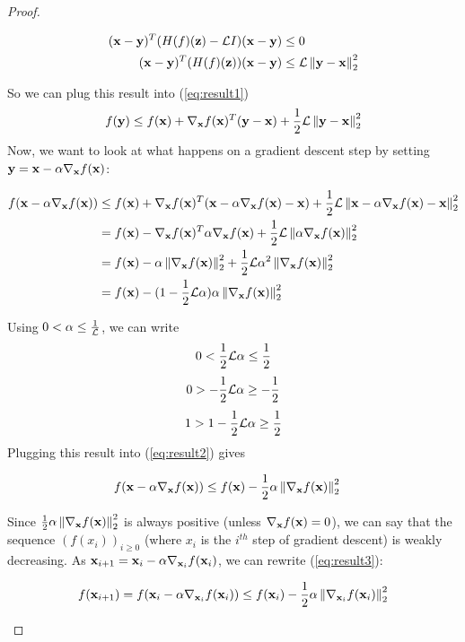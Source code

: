 \begin{proof}
\begin{ceqn}
\begin{align*}
            (\vx-\vy)^T(H(f)(\vz) - \Lip I)(\vx - \vy) &\leq 0 \\
            (\vx-\vy)^T(H(f)(\vz))(\vx - \vy) &\leq \Lip \norm{\vy-\vx}_2^2 
        \end{align*}
    \end{ceqn}
    So we can plug this result into (\ref{eq:result1})
    $$f(\vy) \leq f(\vx) + \nabla_\vx f(\vx)^T(\vy-\vx) + \frac{1}{2} \Lip \norm{\vy-\vx}_2^2$$
    Now, we want to look at what happens on a gradient descent step by setting $\vy = \vx - \alpha \nabla_\vx f(\vx)$:  
    \begin{ceqn}
        \begin{align}
            f(\vx - \alpha \nabla_\vx f(\vx)) &\leq f(\vx) + \nabla_\vx f(\vx)^T(\vx - \alpha \nabla_\vx f(\vx)-\vx) + \frac{1}{2} \Lip \norm{\vx - \alpha \nabla_\vx f(\vx)-\vx}_2^2 \notag \\
            &= f(\vx) - \nabla_\vx f(\vx)^T \alpha \nabla_\vx f(\vx) + \frac{1}{2} \Lip \norm{\alpha \nabla_\vx f(\vx)}_2^2 \notag \\
            &= f(\vx) - \alpha \norm{\nabla_\vx f(\vx)}_2^2 + \frac{1}{2} \Lip \alpha^2 \norm{\nabla_\vx f(\vx)}_2^2\notag \\
            &= f(\vx) - (1 - \frac{1}{2} \Lip \alpha) \alpha \norm{\nabla_\vx f(\vx)}_2^2 \label{eq:result2}
        \end{align}
    \end{ceqn}
    Using $0 < \alpha \leq \frac{1}{\Lip}$, we can write
    $$0 < \frac{1}{2}\Lip\alpha \leq \frac{1}{2}$$
    $$0 > -\frac{1}{2}\Lip\alpha \geq -\frac{1}{2}$$
    $$1 > 1 -\frac{1}{2}\Lip\alpha \geq \frac{1}{2}$$
    Plugging this result into (\ref{eq:result2}) gives
    \begin{ceqn}
        \begin{align}
            &f(\vx - \alpha \nabla_\vx f(\vx)) \leq f(\vx) - \frac{1}{2}\alpha \norm{\nabla_\vx f(\vx)}_2^2 \label{eq:result3}
        \end{align}
    \end{ceqn}
    Since $\frac{1}{2}\alpha \norm{\nabla_\vx f(\vx)}_2^2$ is always positive (unless $\nabla_\vx f(\vx) = 0$), we can say that the sequence $(f(x_i))_{i \geq 0}$ (where $x_i$ is the $i^{th}$ step of gradient descent) is weakly decreasing. As $\vx_{i+1} = \vx_i - \alpha \nabla_{\vx_i} f(\vx_i)$, we can rewrite (\ref{eq:result3}): 
    \begin{ceqn}
        \begin{align}
            f(\vx_{i+1}) = f(\vx_i - \alpha \nabla_{\vx_i} f(\vx_i)) \leq f(\vx_i) - \frac{1}{2}\alpha \norm{\nabla_{\vx_i} f(\vx_i)}_2^2 \label{eq:result4}

\end{align}
\end{ceqn}
\end{proof}

